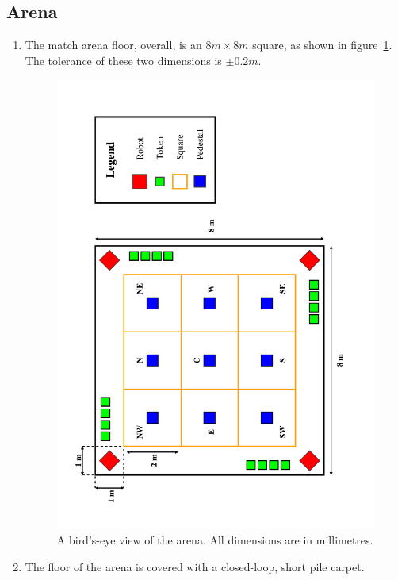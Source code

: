 \subsection{Arena}
\label{sub:arena}
\begin{enumerate}
\item The match arena floor, overall, is an $8m \times 8m$ square, as shown in figure~\ref{fig:arena-dim}.
      The tolerance of these two dimensions is $\pm0.2m$.

\begin{figure}
  \centering
  \includegraphics[width=\textwidth]{./images/arena.pdf}
  \caption{\label{fig:arena-dim}A bird's-eye view of the arena. All dimensions are in millimetres.}
\end{figure}

\item The floor of the arena is covered with a closed-loop, short pile carpet.


\end{enumerate}
